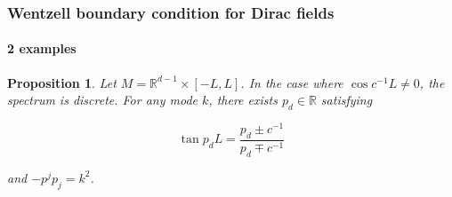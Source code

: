 \documentclass[french]{beamer}
\newtheorem{proposition}{Proposition}
\begin{document}
\begin{frame}
\frametitle{Wentzell boundary condition for Dirac fields}
\framesubtitle{2 examples}

\begin{proposition}
Let ${M} = \mathbb{R}^{d-1} \times [-L, L]$.
In the case where $\cos c^{-1}L \neq 0$,
the spectrum is discrete.
For any mode $k$, there exists $p_d\in \mathbb{R}$ 
satisfying 

\begin{equation*}
\tan p_d L = \frac{p_d \pm c^{-1}}{p_d \mp c^{-1}}
\end{equation*}

and $-p^jp_j = k^2$.
\end{proposition}


\end{frame}
\end{document}
